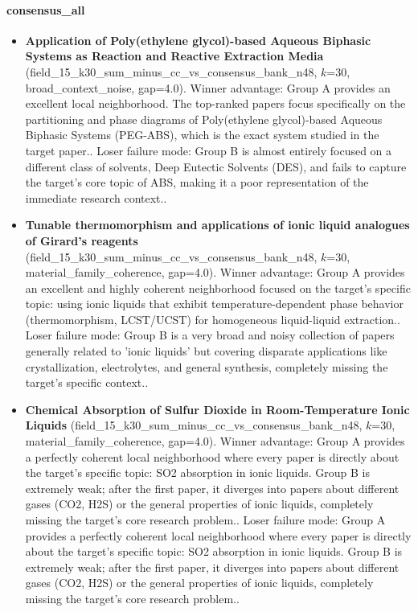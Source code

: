 \paragraph{consensus\_all}
\begin{itemize}
\item \textbf{Application of Poly(ethylene glycol)-based Aqueous Biphasic Systems as Reaction and Reactive Extraction Media} (field\_15\_k30\_sum\_minus\_cc\_vs\_consensus\_bank\_n48, $k$=30, broad\_context\_noise, gap=4.0). Winner advantage: Group A provides an excellent local neighborhood. The top-ranked papers focus specifically on the partitioning and phase diagrams of Poly(ethylene glycol)-based Aqueous Biphasic Systems (PEG-ABS), which is the exact system studied in the target paper.. Loser failure mode: Group B is almost entirely focused on a different class of solvents, Deep Eutectic Solvents (DES), and fails to capture the target's core topic of ABS, making it a poor representation of the immediate research context..
\item \textbf{Tunable thermomorphism and applications of ionic liquid analogues of Girard's reagents} (field\_15\_k30\_sum\_minus\_cc\_vs\_consensus\_bank\_n48, $k$=30, material\_family\_coherence, gap=4.0). Winner advantage: Group A provides an excellent and highly coherent neighborhood focused on the target's specific topic: using ionic liquids that exhibit temperature-dependent phase behavior (thermomorphism, LCST/UCST) for homogeneous liquid-liquid extraction.. Loser failure mode: Group B is a very broad and noisy collection of papers generally related to 'ionic liquids' but covering disparate applications like crystallization, electrolytes, and general synthesis, completely missing the target's specific context..
\item \textbf{Chemical Absorption of Sulfur Dioxide in Room-Temperature Ionic Liquids} (field\_15\_k30\_sum\_minus\_cc\_vs\_consensus\_bank\_n48, $k$=30, material\_family\_coherence, gap=4.0). Winner advantage: Group A provides a perfectly coherent local neighborhood where every paper is directly about the target's specific topic: SO2 absorption in ionic liquids. Group B is extremely weak; after the first paper, it diverges into papers about different gases (CO2, H2S) or the general properties of ionic liquids, completely missing the target's core research problem.. Loser failure mode: Group A provides a perfectly coherent local neighborhood where every paper is directly about the target's specific topic: SO2 absorption in ionic liquids. Group B is extremely weak; after the first paper, it diverges into papers about different gases (CO2, H2S) or the general properties of ionic liquids, completely missing the target's core research problem..

\end{itemize}
